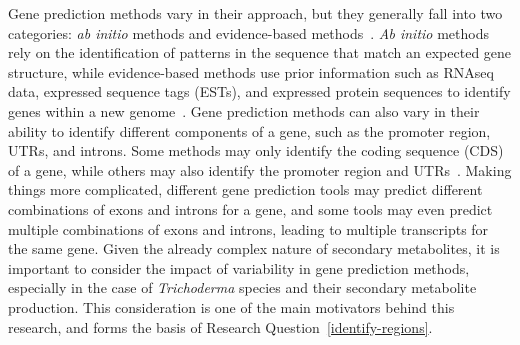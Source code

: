 Gene prediction methods vary in their approach, but they generally fall into two categories: \textit{ab initio} methods and evidence-based methods~\cite{ejigu2020a}. \textit{Ab initio} methods rely on the identification of patterns in the sequence that match an expected gene structure, while evidence-based methods use prior information such as RNAseq data, expressed sequence tags (ESTs), and expressed protein sequences to identify genes within a new genome~\cite{ejigu2020a}. Gene prediction methods can also vary in their ability to identify different components of a gene, such as the promoter region, UTRs, and introns. Some methods may only identify the coding sequence (CDS) of a gene, while others may also identify the promoter region and UTRs~\cite{ejigu2020a}. Making things more complicated, different gene prediction tools may predict different combinations of exons and introns for a gene, and some tools may even predict multiple combinations of exons and introns, leading to multiple transcripts for the same gene. Given the already complex nature of secondary metabolites, it is important to consider the impact of variability in gene prediction methods, especially in the case of \textit{Trichoderma} species and their secondary metabolite production. This consideration is one of the main motivators behind this research, and forms the basis of Research Question~\ref{identify-regions}.

